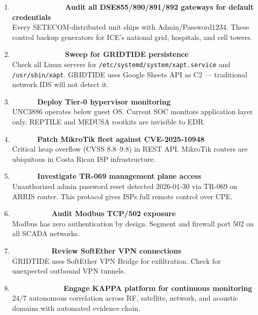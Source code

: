 \documentclass[11pt,a4paper]{article}
\newcommand{\priority}[2]{%
  \colorbox{#1}{\textcolor{white}{\small\textbf{#2}}}%
}
\begin{document}
\begin{enumerate}[label=\textbf{\arabic*.}]
  \item \priority{critred}{IMMEDIATE} \textbf{Audit all DSE855/890/891/892 gateways for default credentials}\\
  Every SETECOM-distributed unit ships with Admin/Password1234. These control backup generators for ICE's national grid, hospitals, and cell towers.

  \item \priority{critred}{IMMEDIATE} \textbf{Sweep for GRIDTIDE persistence}\\
  Check all Linux servers for \texttt{/etc/systemd/system/xapt.service} and \texttt{/usr/sbin/xapt}. GRIDTIDE uses Google Sheets API as C2 — traditional network IDS will not detect it.

  \item \priority{highorange}{HIGH} \textbf{Deploy Tier-0 hypervisor monitoring}\\
  UNC3886 operates below guest OS. Current SOC monitors application layer only. REPTILE and MEDUSA rootkits are invisible to EDR.

  \item \priority{highorange}{HIGH} \textbf{Patch MikroTik fleet against CVE-2025-10948}\\
  Critical heap overflow (CVSS 8.8--9.8) in REST API. MikroTik routers are ubiquitous in Costa Rican ISP infrastructure.

  \item \priority{highorange}{HIGH} \textbf{Investigate TR-069 management plane access}\\
  Unauthorized admin password reset detected 2026-01-30 via TR-069 on ARRIS router. This protocol gives ISPs full remote control over CPE.

  \item \priority{medyellow}{MEDIUM} \textbf{Audit Modbus TCP/502 exposure}\\
  Modbus has zero authentication by design. Segment and firewall port 502 on all SCADA networks.

  \item \priority{medyellow}{MEDIUM} \textbf{Review SoftEther VPN connections}\\
  GRIDTIDE uses SoftEther VPN Bridge for exfiltration. Check for unexpected outbound VPN tunnels.

  \item \priority{stratblue}{STRATEGIC} \textbf{Engage KAPPA platform for continuous monitoring}\\
  24/7 autonomous correlation across RF, satellite, network, and acoustic domains with automated evidence chain.
\end{enumerate}
\end{document}
